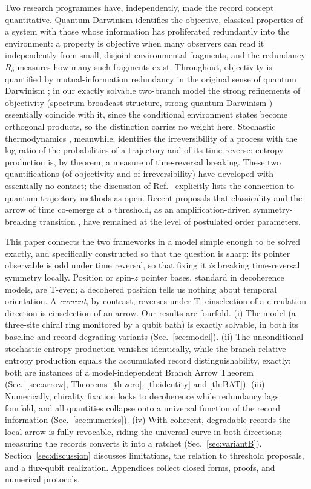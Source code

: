 \documentclass[11pt]{article}
\begin{document}
Two research programmes have, independently, made the record concept quantitative. Quantum Darwinism \cite{Zurek2009,Riedel2012,Zurek2022} identifies the objective, classical properties of a system with those whose information has proliferated redundantly into the environment: a property is objective when many observers can read it independently from small, disjoint environmental fragments, and the redundancy $R_\delta$ measures how many such fragments exist. Throughout, objectivity is quantified by mutual-information redundancy in the original sense of quantum Darwinism \cite{Ollivier2004,Zurek2009}; in our exactly solvable two-branch model the strong refinements of objectivity (spectrum broadcast structure, strong quantum Darwinism \cite{Korbicz2021,Le2019}) essentially coincide with it, since the conditional environment states become orthogonal products, so the distinction carries no weight here. Stochastic thermodynamics \cite{Maes2003,Callens2004,Landi2021}, meanwhile, identifies the irreversibility of a process with the log-ratio of the probabilities of a trajectory and of its time reverse: entropy production is, by theorem, a measure of time-reversal breaking. These two quantifications (of objectivity and of irreversibility) have developed with essentially no contact; the discussion of Ref.~\cite{Riedel2012} explicitly lists the connection to quantum-trajectory methods as open. Recent proposals that classicality and the arrow of time co-emerge at a threshold, as an amplification-driven symmetry-breaking transition \cite{Aharonov2000}, have remained at the level of postulated order parameters.

This paper connects the two frameworks in a model simple enough to be solved exactly, and specifically constructed so that the question is sharp: its pointer observable is odd under time reversal, so that fixing it \emph{is} breaking time-reversal symmetry locally. Position or spin-$z$ pointer bases, standard in decoherence models, are T-even; a decohered position tells us nothing about temporal orientation. A \emph{current}, by contrast, reverses under T: einselection of a circulation direction is einselection of an arrow. Our results are fourfold. (i) The model (a three-site chiral ring monitored by a qubit bath) is exactly solvable, in both its baseline and record-degrading variants (Sec.~\ref{sec:model}). (ii) The unconditional stochastic entropy production vanishes identically, while the branch-relative entropy production equals the accumulated record distinguishability, exactly; both are instances of a model-independent Branch Arrow Theorem (Sec.~\ref{sec:arrow}, Theorems~\ref{th:zero}, \ref{th:identity} and \ref{th:BAT}). (iii) Numerically, chirality fixation locks to decoherence while redundancy lags fourfold, and all quantities collapse onto a universal function of the record information (Sec.~\ref{sec:numerics}). (iv) With coherent, degradable records the local arrow is fully revocable, riding the universal curve in both directions; measuring the records converts it into a ratchet (Sec.~\ref{sec:variantB}). Section~\ref{sec:discussion} discusses limitations, the relation to threshold proposals, and a flux-qubit realization. Appendices collect closed forms, proofs, and numerical protocols.
\end{document}
